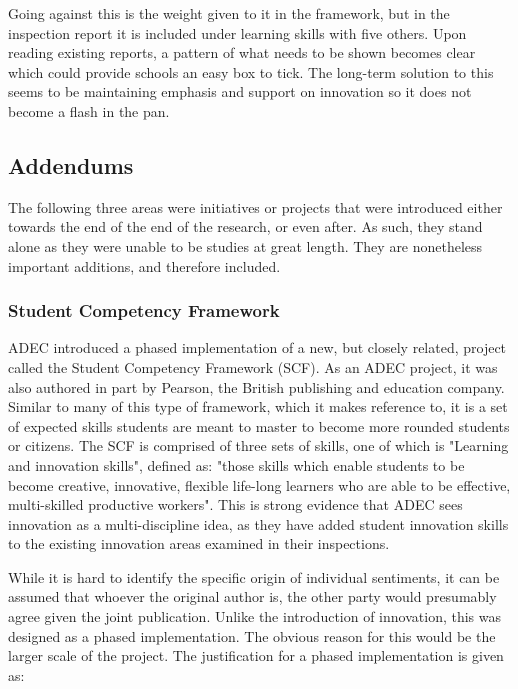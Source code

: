 \documentclass[11pt]{article}
\begin{document}
Going against this is the weight given to it in the framework, but in the inspection report it is included under learning skills with five others. Upon reading existing reports, a pattern of what needs to be shown becomes clear which could provide schools an easy box to tick. The long-term solution to this seems to be maintaining emphasis and support on innovation so it does not become a flash in the pan. 

\subsection{Addendums}
The following three areas were initiatives or projects that were introduced either towards the end of the end of the research, or even after. As such, they stand alone as they were unable to be studies at great length. They are nonetheless important additions, and therefore included.

\subsubsection{Student Competency Framework}

ADEC introduced a phased implementation of a new, but closely related, project called the Student Competency Framework (SCF). As an ADEC project, it was also authored in part by Pearson, the British publishing and education company. Similar to many of this type of framework, which it makes reference to, it is a set of expected skills students are meant to master to become more rounded students or citizens. The SCF is comprised of three sets of skills, one of which is "Learning and innovation skills", defined as: "those skills which enable students to be become creative, innovative, flexible life-long learners who are able to be effective, multi-skilled productive workers". This is strong evidence that ADEC sees innovation as a multi-discipline idea, as they have added student innovation skills to the existing innovation areas examined in their inspections.

While it is hard to identify the specific origin of individual sentiments, it can be assumed that whoever the original author is, the other party would presumably agree given the joint publication. Unlike the introduction of innovation, this was designed as a phased implementation. The obvious reason for this would be the larger scale of the project. The justification for a phased implementation is given as:
\end{document}
